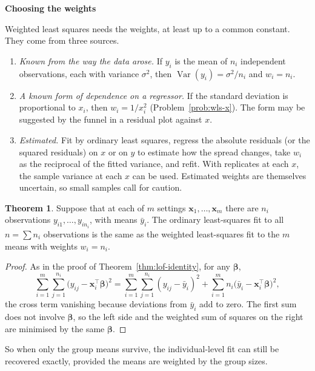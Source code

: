 \documentclass[11pt,a4paper]{article}
\numberwithin{equation}{section}
\theoremstyle{definition}
\newtheorem{thm}{Theorem}[subsection]
\newcommand{\subhead}[1]{%
  \par\medskip\noindent\textbf{#1}\par\nobreak\smallskip}
\begin{document}
\subhead{Choosing the weights}
Weighted least squares needs the weights, at least up to a common constant. They come from
three sources.
\begin{enumerate}[label=(\roman*)]
\item \emph{Known from the way the data arose.} If $y_i$ is the mean of $n_i$ independent
observations, each with variance $\sigma^2$, then $\operatorname{Var}(y_i) = \sigma^2/n_i$ and
$w_i = n_i$.
\item \emph{A known form of dependence on a regressor.} If the standard deviation is
proportional to $x_i$, then $w_i = 1/x_i^2$ (Problem~\ref{prob:wls-x}). The form may be
suggested by the funnel in a residual plot against $x$.
\item \emph{Estimated.} Fit by ordinary least squares, regress the absolute residuals (or the
squared residuals) on $x$ or on $\hat y$ to estimate how the spread changes, take $w_i$ as the
reciprocal of the fitted variance, and refit. With replicates at each $x$, the sample variance
at each $x$ can be used. Estimated weights are themselves uncertain, so small samples call for
caution.
\end{enumerate}

\begin{thm}\label{thm:means-wls}
Suppose that at each of $m$ settings $\mathbf{x}_1, \dots, \mathbf{x}_m$ there are $n_i$ observations
$y_{i1}, \dots, y_{in_i}$, with means $\bar y_i$. The ordinary least-squares fit to all
$n = \sum n_i$ observations is the same as the weighted least-squares fit to the $m$ means
with weights $w_i = n_i$.
\end{thm}

\begin{proof}
As in the proof of Theorem~\ref{thm:lof-identity}, for any $\boldsymbol\beta$,
\[
\sum_{i=1}^m\sum_{j=1}^{n_i}\bigl(y_{ij} - \mathbf{x}_i^\top\boldsymbol\beta\bigr)^2
= \sum_{i=1}^m\sum_{j=1}^{n_i}(y_{ij} - \bar y_i)^2 + \sum_{i=1}^m n_i\bigl(\bar y_i - \mathbf{x}_i^\top\boldsymbol\beta\bigr)^2 ,
\]
the cross term vanishing because deviations from $\bar y_i$ add to zero. The first sum does not
involve $\boldsymbol\beta$, so the left side and the weighted sum of squares on the right are
minimised by the same $\boldsymbol\beta$.
\end{proof}

So when only the group means survive, the individual-level fit can still be recovered exactly,
provided the means are weighted by the group sizes.
\end{document}
